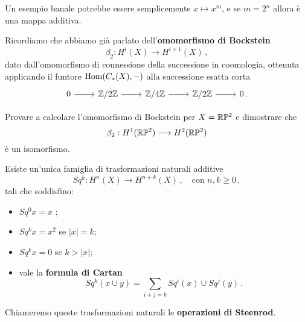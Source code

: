 \begin{ex}
	Un esempio banale potrebbe essere semplicemente
	$x \mapsto x^{m}$, e se $m = 2^{n}$ allora è una mappa additiva.
\end{ex}

\begin{ex}
	Ricordiamo che abbiamo già parlato dell'\textbf{omomorfismo di Bockstein}
	\begin{equation*}
		\beta_{2} : H^{i}(X) \longrightarrow H^{i+1}(X)\,,
	\end{equation*}
	dato dall'omomorfismo di connessione della successione in coomologia,
	ottenuta applicando il funtore $\operatorname{Hom}(C_{*}(X), - )$ alla successione
	esatta corta
	\begin{equation*}
		\begin{tikzcd}
			0 \ar[r] & \Z/2\Z \ar[r]
			& \Z/4\Z \ar[r]
			& \Z/2\Z \ar[r]
			& 0\,.
		\end{tikzcd}
	\end{equation*}
\end{ex}

\begin{exercise}
	Provare a calcolare l'omomorfismo di Bockstein per $X = {\mathbb R}\mathbb{P}^{2}$
	e dimostrare che
	\begin{equation*}
		\beta_{2} : H^{1}({\mathbb R}\mathbb{P}^{2}) \longrightarrow H^{2}({\mathbb R}\mathbb{P}^{2})
	\end{equation*}
	è un isomorfismo.
\end{exercise}

\begin{thm}\label{steenrod-uniche}
	Esiste un'unica famiglia di trasformazioni naturali additive
	\begin{equation*}
		Sq^{k} : H^{n}(X) \longrightarrow H^{n+k}(X)\,, \quad \text{con } n,k \ge 0\,,
	\end{equation*}
	tali che soddisfino:
	\begin{itemize}
		\item $Sq^{0}x = x$ ;
		\item $Sq^{k}x = x^{2}$ se $|x|=k$;
		\item $Sq^{k}x = 0$ se $k > |x|$;
		\item vale la \textbf{formula di Cartan}
		\begin{equation}\label{formula-cartan}
			Sq^{k}(x \cup y) = \sum_{i + j = k} Sq^{i}(x) \cup Sq^{j}(y)\,.
		\end{equation}
	\end{itemize}
	Chiameremo queste trasformazioni naturali le \textbf{operazioni di Steenrod}.
\end{thm}

